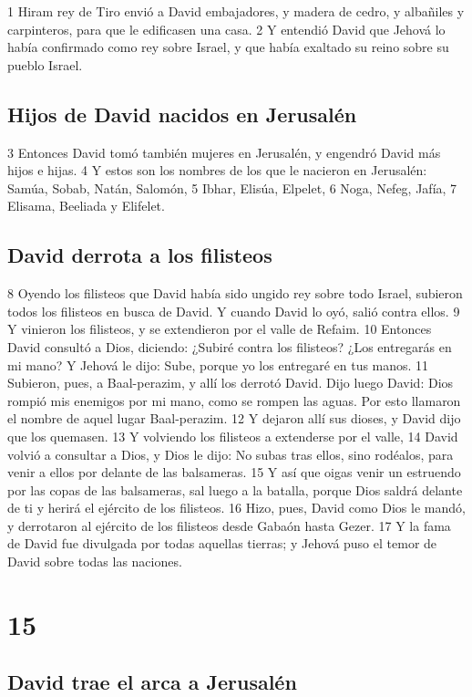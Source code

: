 1 Hiram rey de Tiro envió a David embajadores, y madera de cedro, y albañiles y carpinteros, para que le edificasen una casa.
2 Y entendió David que Jehová lo había confirmado como rey sobre Israel, y que había exaltado su reino sobre su pueblo Israel.

\section*{Hijos de David nacidos en Jerusalén}

3 Entonces David tomó también mujeres en Jerusalén, y engendró David más hijos e hijas.
4 Y estos son los nombres de los que le nacieron en Jerusalén: Samúa, Sobab, Natán, Salomón,
5 Ibhar, Elisúa, Elpelet,
6 Noga, Nefeg, Jafía,
7 Elisama, Beeliada y Elifelet.

\section*{David derrota a los filisteos}

8 Oyendo los filisteos que David había sido ungido rey sobre todo Israel, subieron todos los filisteos en busca de David. Y cuando David lo oyó, salió contra ellos.
9 Y vinieron los filisteos, y se extendieron por el valle de Refaim.
10 Entonces David consultó a Dios, diciendo: ¿Subiré contra los filisteos? ¿Los entregarás en mi mano? Y Jehová le dijo: Sube, porque yo los entregaré en tus manos.
11 Subieron, pues, a Baal-perazim, y allí los derrotó David. Dijo luego David: Dios rompió mis enemigos por mi mano, como se rompen las aguas. Por esto llamaron el nombre de aquel lugar Baal-perazim.
12 Y dejaron allí sus dioses, y David dijo que los quemasen.
13 Y volviendo los filisteos a extenderse por el valle,
14 David volvió a consultar a Dios, y Dios le dijo: No subas tras ellos, sino rodéalos, para venir a ellos por delante de las balsameras.
15 Y así que oigas venir un estruendo por las copas de las balsameras, sal luego a la batalla, porque Dios saldrá delante de ti y herirá el ejército de los filisteos.
16 Hizo, pues, David como Dios le mandó, y derrotaron al ejército de los filisteos desde Gabaón hasta Gezer.
17 Y la fama de David fue divulgada por todas aquellas tierras; y Jehová puso el temor de David sobre todas las naciones. 


\chapter{15}

\section*{David trae el arca a Jerusalén}

